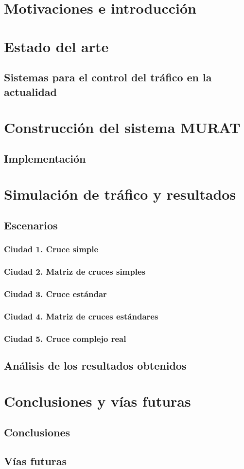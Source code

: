 \part{Motivaciones e introducción}


\part{Estado del arte}
\chapter{Sistemas para el control del tráfico en la actualidad}

\part{Construcción del sistema MURAT}




\chapter{Implementación}

\part{Simulación de tráfico y resultados}
\chapter{Escenarios}
\section{Ciudad 1. Cruce simple}
\section{Ciudad 2. Matriz de cruces simples}
\section{Ciudad 3. Cruce estándar}
\section{Ciudad 4. Matriz de cruces estándares}
\section{Ciudad 5. Cruce complejo real}

\chapter{Análisis de los resultados obtenidos}

\part{Conclusiones y vías futuras}
\chapter{Conclusiones}

\chapter{Vías futuras}

